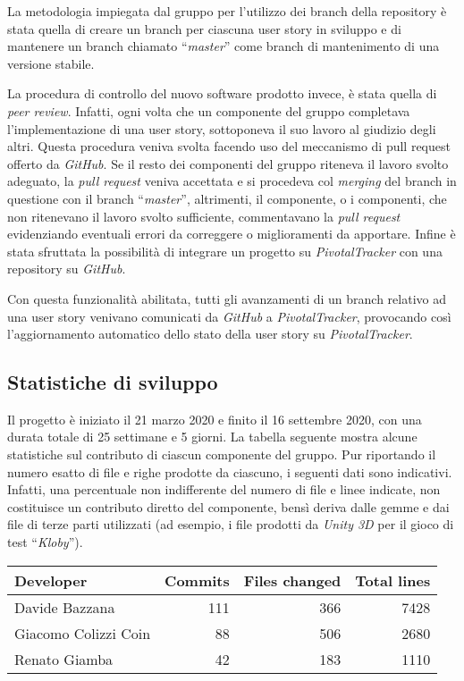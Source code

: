 \documentclass[binding=0.6cm,Lau]{sapthesis}
\begin{document}
La metodologia impiegata dal gruppo per l'utilizzo dei branch della
repository è stata quella di creare un branch per ciascuna user story
in sviluppo e di mantenere un branch chiamato ``\textit{master}'' come
branch di mantenimento di una versione stabile.

La procedura di controllo del nuovo software prodotto invece, è stata
quella di \textit{peer review}. Infatti, ogni volta che un componente
del gruppo completava l'implementazione di una user story, sottoponeva
il suo lavoro al giudizio degli altri. Questa procedura veniva svolta
facendo uso del meccanismo di pull request offerto da
\textit{GitHub}. Se il resto dei componenti del gruppo riteneva il
lavoro svolto adeguato, la \textit{pull request} veniva accettata e si
procedeva col \textit{merging} del branch in questione con il branch
``\textit{master}'', altrimenti, il componente, o i componenti, che
non ritenevano il lavoro svolto sufficiente, commentavano la
\textit{pull request} evidenziando eventuali errori da correggere o
miglioramenti da apportare.
\newline
\newline
Infine è stata sfruttata la possibilità di integrare un progetto su
\textit{PivotalTracker} con una repository su \textit{GitHub}.

Con questa funzionalità abilitata, tutti gli avanzamenti di un branch
relativo ad una user story venivano comunicati da \textit{GitHub} a
\textit{PivotalTracker}, provocando così l'aggiornamento automatico
dello stato della user story su \textit{PivotalTracker}.

\subsection{Statistiche di sviluppo}
Il progetto è iniziato il 21 marzo 2020 e finito il 16 settembre
2020, con una durata totale di 25 settimane e 5 giorni.
\newline
\newline
La tabella seguente mostra alcune statistiche sul contributo di
ciascun componente del gruppo. Pur riportando il numero esatto di file
e righe prodotte da ciascuno, i seguenti dati sono
indicativi. Infatti, una percentuale non indifferente del numero di
file e linee indicate, non costituisce un contributo diretto del
componente, bensì deriva dalle gemme e dai file di terze parti
utilizzati (ad esempio, i file prodotti da \textit{Unity 3D} per il
gioco di test ``\textit{Kloby}'').

\vspace{1cm}
\begin{tabular}{l|r|r|r}
  \textbf{Developer} & \textbf{Commits} & \textbf{Files changed} & \textbf{Total lines} \\
  \hline
  Davide Bazzana & 111 & 366 & 7428 \\
  \hline
  Giacomo Colizzi Coin & 88 & 506 & 2680 \\
  \hline
  Renato Giamba & 42 & 183 & 1110 \\
  \hline
\end{tabular}

\backmatter
\cleardoublepage
{}
{}
	
\end{document}
